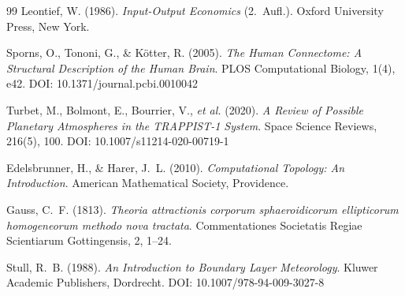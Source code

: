 ﻿\documentclass[a4paper,12pt]{article}
\theoremstyle{definition}
\begin{document}
\begin{thebibliography}{99}
Leontief, W. (1986).
\textit{Input-Output Economics} (2.~Aufl.).
Oxford University Press, New York.

Sporns, O., Tononi, G., \& Kötter, R. (2005).
\textit{The Human Connectome: A Structural Description of the Human Brain}.
PLOS Computational Biology, 1(4), e42.
DOI: 10.1371/journal.pcbi.0010042

Turbet, M., Bolmont, E., Bourrier, V., \textit{et al.} (2020).
\textit{A Review of Possible Planetary Atmospheres in the TRAPPIST-1
System}. Space Science Reviews, 216(5), 100.
DOI: 10.1007/s11214-020-00719-1

Edelsbrunner, H., \& Harer, J.~L. (2010).
\textit{Computational Topology: An Introduction}.
American Mathematical Society, Providence.

Gauss, C.~F. (1813).
\textit{Theoria attractionis corporum sphaeroidicorum ellipticorum
homogeneorum methodo nova tractata}.
Commentationes Societatis Regiae Scientiarum Gottingensis, 2, 1--24.

Stull, R.~B. (1988).
\textit{An Introduction to Boundary Layer Meteorology}.
Kluwer Academic Publishers, Dordrecht.
DOI: 10.1007/978-94-009-3027-8

\end{thebibliography}
\end{document}
